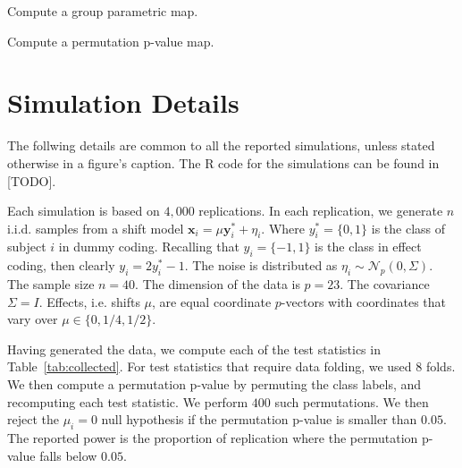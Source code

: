 \documentclass[12pt,a4paper]{article}
\theoremstyle{definition}
\newcommand{\set}[1]{\{ #1 \}} %
\newcommand{\rv}[1]{\mathbf{#1}} %
\newcommand{\x}{\rv x} %
\newcommand{\y}{\rv y} %
\newcommand{\gaussp}[2]{\mathcal{N}_{#1}\left(#2\right)} %
\begin{document}
\begin{algorithm}[H]
\caption{Compute a group parametric map.}
\label{algo:statistic}

\end{algorithm}


\begin{algorithm}[H]
\caption{Compute a permutation p-value map.} 
\label{algo:permutation}

\end{algorithm}

\newpage


\section{Simulation Details}
\label{apx:simulation_details}

The follwing details are common to all the reported simulations, unless stated otherwise in a figure's caption. 
The \textsf{R} code for the simulations can be found in [TODO].

Each simulation is based on $4,000$ replications. 
In each replication, we generate $n$ i.i.d. samples from a shift model $\x_i = \mu \y^*_i + \eta_i$.
Where $y^*_i=\set{0,1}$ is the class of subject $i$ in dummy coding. 
Recalling that $y_i=\set{-1,1}$ is the class in effect coding, then clearly $y_i=2 y^*_i-1$.
The noise is distributed as $\eta_i \sim \gaussp{p}{0,\Sigma}$. 
The sample size $n=40$. 
The dimension of the data is $p=23$. 
The covariance $\Sigma=I$. 
Effects, i.e. shifts $\mu$, are equal coordinate $p$-vectors with coordinates that vary over $\mu \in \set{0,1/4,1/2}$.

Having generated the data, we compute each of the test statistics in Table~\ref{tab:collected}.
For test statistics that require data folding, we used $8$ folds. 
We then compute a permutation p-value by permuting the class labels, and recomputing each test statistic. 
We perform $400$ such permutations. 
We then reject the $\mu_i=0$ null hypothesis if the permutation p-value is smaller than $0.05$.
The reported power is the proportion of replication where the permutation p-value falls below $0.05$.
\end{document}
